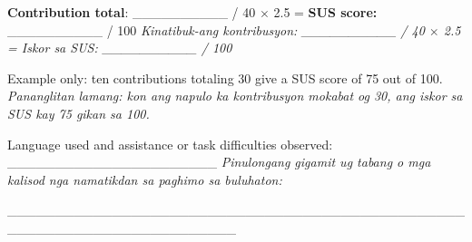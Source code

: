 \textbf{Contribution total}: \_\allowbreak{}\_\allowbreak{}\_\allowbreak{}\_\allowbreak{}\_\allowbreak{}\_\allowbreak{}\_\allowbreak{}\_\allowbreak{}\_\allowbreak{}\_\allowbreak{} / 40 \ensuremath{\times} 2.5 = \textbf{SUS score:} \_\allowbreak{}\_\allowbreak{}\_\allowbreak{}\_\allowbreak{}\_\allowbreak{}\_\allowbreak{}\_\allowbreak{}\_\allowbreak{}\_\allowbreak{}\_\allowbreak{} / 100 \textit{Kinatibuk-ang kontribusyon: \_\allowbreak{}\_\allowbreak{}\_\allowbreak{}\_\allowbreak{}\_\allowbreak{}\_\allowbreak{}\_\allowbreak{}\_\allowbreak{}\_\allowbreak{}\_\allowbreak{} / 40 \ensuremath{\times} 2.5 = Iskor sa SUS: \_\allowbreak{}\_\allowbreak{}\_\allowbreak{}\_\allowbreak{}\_\allowbreak{}\_\allowbreak{}\_\allowbreak{}\_\allowbreak{}\_\allowbreak{}\_\allowbreak{} / 100}

Example only: ten contributions totaling 30 give a SUS score of 75 out of 100. \textit{Pananglitan lamang: kon ang napulo ka kontribusyon mokabat og 30, ang iskor sa SUS kay 75 gikan sa 100.}

Language used and assistance or task difficulties observed: \_\allowbreak{}\_\allowbreak{}\_\allowbreak{}\_\allowbreak{}\_\allowbreak{}\_\allowbreak{}\_\allowbreak{}\_\allowbreak{}\_\allowbreak{}\_\allowbreak{}\_\allowbreak{}\_\allowbreak{}\_\allowbreak{}\_\allowbreak{}\_\allowbreak{}\_\allowbreak{}\_\allowbreak{}\_\allowbreak{}\_\allowbreak{}\_\allowbreak{}\_\allowbreak{}\_\allowbreak{} \textit{Pinulongang gigamit ug tabang o mga kalisod nga namatikdan sa paghimo sa buluhaton:}

\_\allowbreak{}\_\allowbreak{}\_\allowbreak{}\_\allowbreak{}\_\allowbreak{}\_\allowbreak{}\_\allowbreak{}\_\allowbreak{}\_\allowbreak{}\_\allowbreak{}\_\allowbreak{}\_\allowbreak{}\_\allowbreak{}\_\allowbreak{}\_\allowbreak{}\_\allowbreak{}\_\allowbreak{}\_\allowbreak{}\_\allowbreak{}\_\allowbreak{}\_\allowbreak{}\_\allowbreak{}\_\allowbreak{}\_\allowbreak{}\_\allowbreak{}\_\allowbreak{}\_\allowbreak{}\_\allowbreak{}\_\allowbreak{}\_\allowbreak{}\_\allowbreak{}\_\allowbreak{}\_\allowbreak{}\_\allowbreak{}\_\allowbreak{}\_\allowbreak{}\_\allowbreak{}\_\allowbreak{}\_\allowbreak{}\_\allowbreak{}\_\allowbreak{}\_\allowbreak{}\_\allowbreak{}\_\allowbreak{}\_\allowbreak{}\_\allowbreak{}\_\allowbreak{}\_\allowbreak{}\_\allowbreak{}\_\allowbreak{}\_\allowbreak{}\_\allowbreak{}\_\allowbreak{}\_\allowbreak{}\_\allowbreak{}\_\allowbreak{}\_\allowbreak{}\_\allowbreak{}\_\allowbreak{}\_\allowbreak{}\_\allowbreak{}\_\allowbreak{}\_\allowbreak{}\_\allowbreak{}\_\allowbreak{}\_\allowbreak{}\_\allowbreak{}\_\allowbreak{}\_\allowbreak{}\_\allowbreak{}\_\allowbreak{}\_\allowbreak{}

